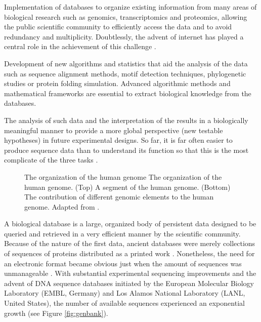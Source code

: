 \begin{menumerate}
\item
Implementation of databases to organize existing information from many areas of biological research
such as genomics, transcriptomics and proteomics, allowing the public scientific community to 
efficiently access the data and to avoid redundancy and multiplicity. Doubtlessly, the advent of 
internet has played a central role in the achievement of this challenge \citep{goodman:2002a}.
\item
Development of new algorithms and statistics that aid the analysis of the data such as sequence 
alignment methods, motif detection techniques, phylogenetic studies or protein folding simulation.
Advanced algorithmic methods and mathematical frameworks are essential to extract biological
knowledge from the databases.
\item
The analysis of such data and the interpretation of the results in a biologically meaningful 
manner to provide a more global perspective (new testable hypotheses) in future experimental designs. 
So far, it is far often easier to produce sequence data than to understand its function so that this 
is the most complicate of the three tasks \citep{bogusky:1998a,claverie:2000a,pearson:2001a}.
\end{menumerate}


\begin{figure}[t!]
\begin{center}
\setlength{\fboxsep}{0pt}
          {The organization of the human genome}%
          {The organization of the human genome.}%
          {(Top) A segment of the human genome.
           (Bottom) The contribution of different genomic elements to the human genome.
           Adapted from \citet{brown:1999a}.}
\end{center}
\end{figure}


A biological database is a large, organized body of persistent data designed to be queried
and retrieved in a very efficient manner by the scientific community. Because of the nature of the 
first data, ancient databases were merely collections of sequences of proteins distributed as a printed 
work \citep{dayhoff:1965a}. Nonetheless, the need for an electronic format became obvious just when the 
amount of sequences was unmanageable \citep{baxevanis:2005a,mount:2001a}. With substantial experimental 
sequencing improvements and the advent of DNA sequence databases initiated by the European Molecular 
Biology Laboratory (EMBL, Germany) and Los Alamos National Laboratory (LANL, United States), the 
number of available sequences experienced an exponential growth (see Figure \ref{fig:genbank}).

